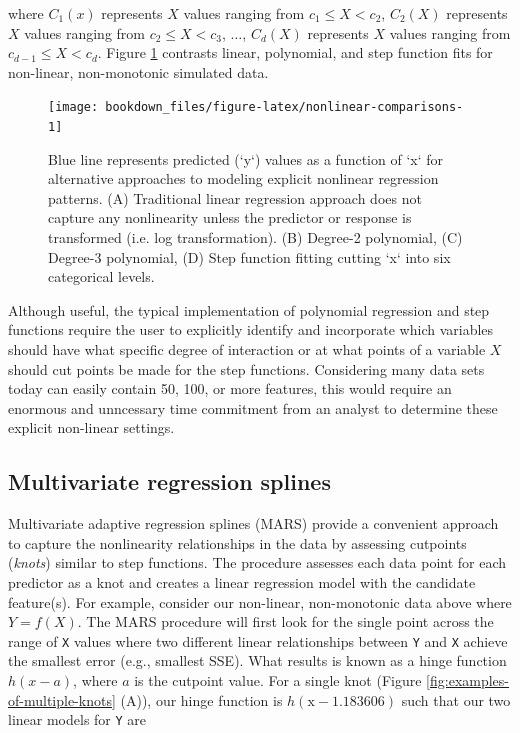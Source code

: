 \documentclass[]{krantz}
\begin{document}
where \(C_1(x)\) represents \(X\) values ranging from \(c_1 \leq X < c_2\), \(C_2\left(X\right)\) represents \(X\) values ranging from \(c_2 \leq X < c_3\), \(\dots\), \(C_d\left(X\right)\) represents \(X\) values ranging from \(c_{d-1} \leq X < c_d\). Figure \ref{fig:nonlinear-comparisons} contrasts linear, polynomial, and step function fits for non-linear, non-monotonic simulated data.

\begin{figure}

{\centering \texttt{[image: bookdown\_files/figure-latex/nonlinear-comparisons-1]} 

}

\caption{Blue line represents predicted (`y`) values as a function of `x` for alternative approaches to modeling explicit nonlinear regression patterns. (A) Traditional linear regression approach does not capture any nonlinearity unless the predictor or response is transformed (i.e. log transformation). (B) Degree-2 polynomial, (C) Degree-3 polynomial, (D) Step function fitting cutting `x` into six categorical levels.}\label{fig:nonlinear-comparisons}
\end{figure}

Although useful, the typical implementation of polynomial regression and step functions require the user to explicitly identify and incorporate which variables should have what specific degree of interaction or at what points of a variable \(X\) should cut points be made for the step functions. Considering many data sets today can easily contain 50, 100, or more features, this would require an enormous and unncessary time commitment from an analyst to determine these explicit non-linear settings.

\hypertarget{multivariate-regression-splines}{%
\subsection{Multivariate regression splines}\label{multivariate-regression-splines}}

Multivariate adaptive regression splines (MARS) provide a convenient approach to capture the nonlinearity relationships in the data by assessing cutpoints (\emph{knots}) similar to step functions. The procedure assesses each data point for each predictor as a knot and creates a linear regression model with the candidate feature(s). For example, consider our non-linear, non-monotonic data above where \(Y = f\left(X\right)\). The MARS procedure will first look for the single point across the range of \texttt{X} values where two different linear relationships between \texttt{Y} and \texttt{X} achieve the smallest error (e.g., smallest SSE). What results is known as a hinge function \(h\left(x-a\right)\), where \(a\) is the cutpoint value. For a single knot (Figure \ref{fig:examples-of-multiple-knots} (A)), our hinge function is \(h\left(\text{x}-1.183606\right)\) such that our two linear models for \texttt{Y} are
\end{document}
